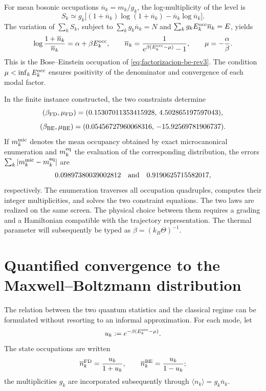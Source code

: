 For mean bosonic occupations
\(\overline n_k=m_k/g_k\), the log-multiplicity of the level is
\begin{equation}
 S_k\simeq
 g_k\bigl[(1+\overline n_k)\log(1+\overline n_k)
          -\overline n_k\log\overline n_k\bigr].
 \label{eq:entropia-be-nivel-rev3}
\end{equation}
The variation of \(\sum_kS_k\), subject to
\(\sum_kg_k\overline n_k=N\) and
\(\sum_kg_kE_k^{\rm occ}\overline n_k=E\), yields
\begin{equation}
 \log\frac{1+\overline n_k}{\overline n_k}
 =\alpha+\beta E_k^{\rm occ},
 \qquad
 \overline n_k
 =\frac{1}{e^{\beta(E_k^{\rm occ}-\mu)}-1},
 \qquad
 \mu=-\frac{\alpha}{\beta}.
 \label{eq:variacion-be-rev3}
\end{equation}
This is the Bose--Einstein occupation of
\eqref{eq:factorizacion-be-rev3}. The condition
\(\mu<\inf_kE_k^{\rm occ}\) ensures positivity of the denominator and
convergence of each modal factor.

In the finite instance constructed, the two constraints determine
\[
 (\beta_{\rm FD},\mu_{\rm FD})
 =(0.15307011353415928,\,4.502865197597043),
\]
\[
 (\beta_{\rm BE},\mu_{\rm BE})
 =(0.05456727960068316,\,-15.92569781906737).
\]
If \(m_k^{\rm mic}\) denotes the mean occupancy obtained by exact
microcanonical enumeration and \(m_k^{\rm eq}\) the evaluation of the corresponding
distribution, the errors
\(\sum_k|m_k^{\rm mic}-m_k^{\rm eq}|\) are
\[
 0.09897380039002812\quad\hbox{and}\quad
 0.9190625715582017,
\]
respectively. The enumeration traverses all occupation quadruples,
computes their integer multiplicities, and solves the two constraint
equations. The two laws are realized on the same screen. The physical choice
between them requires a grading and a Hamiltonian compatible with the
trajectory representation. The thermal parameter will subsequently be typed
as \(\beta=(k_B\Theta)^{-1}\).

\section{Quantified convergence to the Maxwell--Boltzmann distribution}

The relation between the two quantum statistics and the classical regime can
be formulated without resorting to an informal approximation. For each mode, let
\[
 u_k:=e^{-\beta(E_k^{\rm occ}-\mu)}.
\]
The state occupations are written
\[
 \overline n_k^{\rm FD}=\frac{u_k}{1+u_k},
 \qquad
 \overline n_k^{\rm BE}=\frac{u_k}{1-u_k};
\]
the multiplicities \(g_k\) are incorporated subsequently through
\(\langle n_k\rangle=g_k\overline n_k\).

